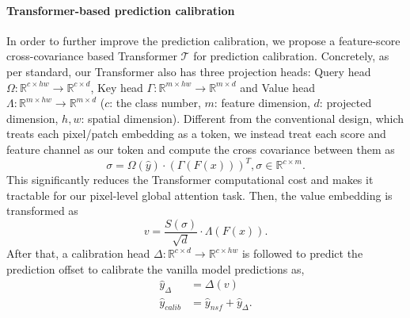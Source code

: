 \documentclass[journal]{IEEEtran}
\begin{document}
\paragraph{Transformer-based prediction calibration} In order to further improve the prediction calibration, we propose a feature-score cross-covariance based Transformer $\mathcal{T}$ for prediction calibration. Concretely, as per standard, our Transformer also has three projection heads: Query head $\Omega: \mathbb{R}^{c\times hw} \rightarrow \mathbb{R}^{c\times d}$, Key head $\Gamma: \mathbb{R}^{m\times hw} \rightarrow \mathbb{R}^{m\times d}$ and Value head $\Lambda: \mathbb{R}^{m\times hw} \rightarrow \mathbb{R}^{m\times d}$ ($c$: the class number, $m$: feature dimension, $d$: projected dimension, $h,w$: spatial dimension). Different from the conventional design, which treats each pixel/patch embedding as a token, we instead treat each score and feature channel as our token and compute the cross covariance between them as
\begin{equation}
\label{eq:cov}
  \sigma  = \Omega(\hat{y}) \cdot (\Gamma(F(x)))^T, \sigma \in \mathbb{R}^{c \times m}.
\end{equation}
This significantly reduces the Transformer computational cost and makes it tractable for our pixel-level global attention task. Then, the value embedding is transformed as
\begin{equation}
\label{eq:pc1}
  v = \frac{S(\sigma)}{\sqrt{d}} \cdot \Lambda(F(x)).
\end{equation}
After that, a calibration head $\Delta: \mathbb{R}^{c\times d} \rightarrow \mathbb{R}^{c\times hw}$ is followed to predict the prediction offset to calibrate the vanilla model predictions as,
\begin{equation}
\label{eq:pc2}
\begin{aligned}
  \hat{y}_{\Delta} & = \Delta(v) \\
  \hat{y}_{calib} & = \hat{y}_{nsf} + \hat{y}_{\Delta}.
\end{aligned}
\end{equation}
\end{document}
